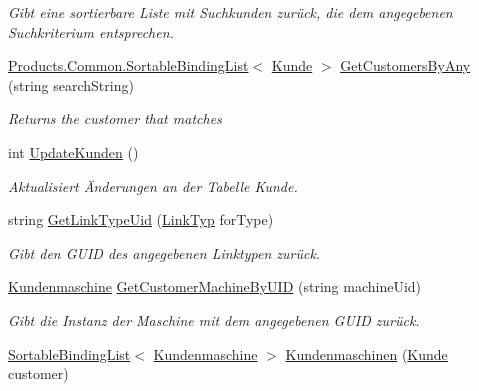 \begin{DoxyCompactItemize}
\begin{DoxyCompactList}\small\item\em Gibt eine sortierbare Liste mit Suchkunden zurück, die dem angegebenen Suchkriterium entsprechen. \end{DoxyCompactList}\item 
\hyperlink{class_products_1_1_common_1_1_sortable_binding_list}{Products.\+Common.\+Sortable\+Binding\+List}$<$ \hyperlink{class_products_1_1_model_1_1_entities_1_1_kunde}{Kunde} $>$ \hyperlink{class_products_1_1_model_1_1_model_service_af4140900909314a5c531b99ca9e8bc53}{Get\+Customers\+By\+Any} (string search\+String)
\begin{DoxyCompactList}\small\item\em Returns the customer that matches \end{DoxyCompactList}\item 
int \hyperlink{class_products_1_1_model_1_1_model_service_a904e3a2bb9afecaf9d22b1b2efb6451e}{Update\+Kunden} ()
\begin{DoxyCompactList}\small\item\em Aktualisiert Änderungen an der Tabelle Kunde. \end{DoxyCompactList}\item 
string \hyperlink{class_products_1_1_model_1_1_model_service_ab68f34539660324d85f7c0dfb1801e9a}{Get\+Link\+Type\+Uid} (\hyperlink{namespace_products_1_1_model_a0ea8a130b9a610541b442971b91cbc31}{Link\+Typ} for\+Type)
\begin{DoxyCompactList}\small\item\em Gibt den G\+U\+ID des angegebenen Linktypen zurück. \end{DoxyCompactList}\item 
\hyperlink{class_products_1_1_model_1_1_entities_1_1_kundenmaschine}{Kundenmaschine} \hyperlink{class_products_1_1_model_1_1_model_service_a32038c578fa59a85e5483a171b9d7443}{Get\+Customer\+Machine\+By\+U\+ID} (string machine\+Uid)
\begin{DoxyCompactList}\small\item\em Gibt die Instanz der Maschine mit dem angegebenen G\+U\+ID zurück. \end{DoxyCompactList}\item 
\hyperlink{class_products_1_1_common_1_1_sortable_binding_list}{Sortable\+Binding\+List}$<$ \hyperlink{class_products_1_1_model_1_1_entities_1_1_kundenmaschine}{Kundenmaschine} $>$ \hyperlink{class_products_1_1_model_1_1_model_service_adf9f734fcaa1106202c223cc3ed271cd}{Kundenmaschinen} (\hyperlink{class_products_1_1_model_1_1_entities_1_1_kunde}{Kunde} customer)

\end{DoxyCompactItemize}
